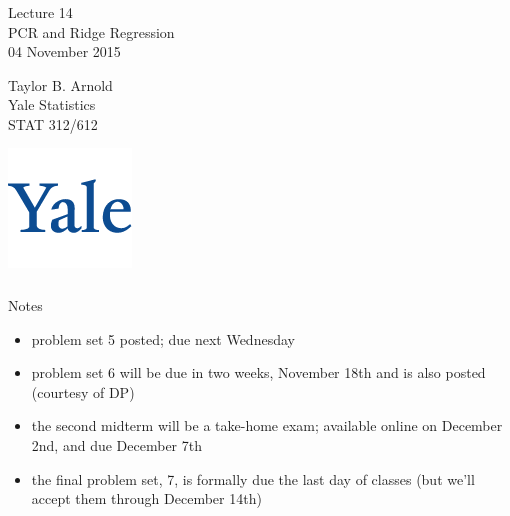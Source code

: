 



\begin{frame}[fragile] \frametitle{}

\vfill

{\fontsize{0.7cm}{0cm}\selectfont Lecture 14 \\\vspace{0.2cm}
PCR and Ridge Regression}\\\vspace{0.5cm}
04 November 2015

\vspace{2cm}

\begin{minipage}{0.6\textwidth}
Taylor B. Arnold \\
Yale Statistics \\
STAT 312/612
\end{minipage}
\hfill
\begin{minipage}{0.3\textwidth}\raggedleft
\includegraphics[scale=0.3]{../yale-logo.png}
\end{minipage}%

\end{frame}

\begin{frame}[fragile] \frametitle{}

{\color{yaleblue}\fontsize{16pt}{20pt}\selectfont Notes}

\begin{itemize}
\item problem set 5 posted; due next Wednesday \pause
\item problem set 6 will be due in two weeks, November 18th
  and is also posted (courtesy of DP) \pause
\item the second midterm will be a take-home exam; available online on
  December 2nd, and due December 7th \pause
\item the final problem set, 7, is formally due the last day of
  classes (but we'll accept them through December 14th)
\end{itemize}

\end{frame}

